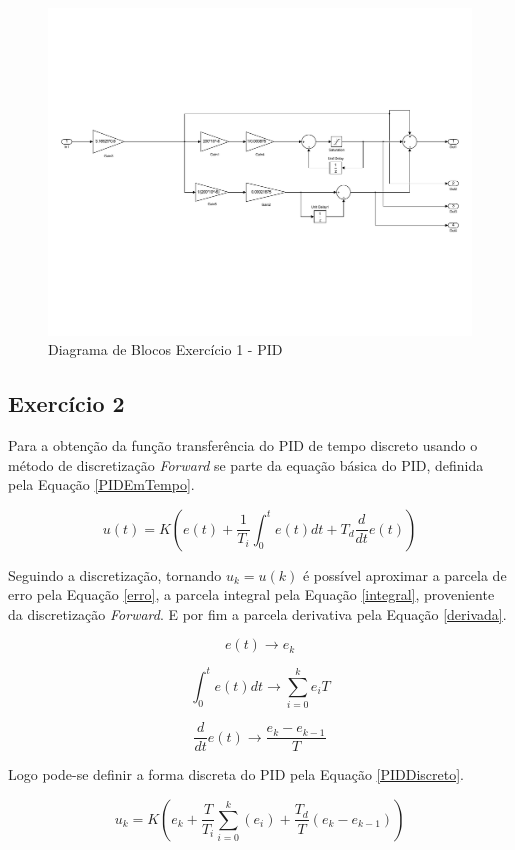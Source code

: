 	\begin{figure}[H]
		\centering
		\includegraphics[scale = .4]{Imagens/Exercicio1_PID_Simulink.pdf}
		\caption{Diagrama de Blocos Exercício 1 - PID}
		\label{fig:Exercicio1_PID_Simulink}
	\end{figure}
	
\subsection{Exercício 2}
	Para a obtenção da função transferência do PID de tempo discreto usando o método de discretização \emph{Forward} se parte da equação básica do PID, definida pela Equação \ref{PIDEmTempo}.
	
	\begin{equation}
		u(t) = K \left( e(t) + \frac{1}{T_{i}} \int_0^t e(t) dt + T_d \frac{d}{dt} e(t) \right) 
		\label{PIDEmTempo}
	\end{equation}
	
	Seguindo a discretização, tornando $u_k = u(k)$ é possível aproximar a parcela de erro pela Equação \ref{erro}, a parcela integral pela Equação \ref{integral}, proveniente da discretização \emph{Forward}. E por fim a parcela derivativa pela Equação \ref{derivada}.
	
	\begin{equation}
		e(t) \rightarrow e_k
		\label{erro}
	\end{equation}
		
	\begin{equation}
		\int_0^t e(t) dt \rightarrow \sum_{i=0}^{k} e_i T
		\label{integral}
	\end{equation}
	
	\begin{equation}
		\frac{d}{dt} e(t) \rightarrow \frac{e_k - e_{k-1}}{T}
		\label{derivada}
	\end{equation}
	
	Logo pode-se definir a forma discreta do PID pela Equação \ref{PIDDiscreto}.
	 
	\begin{equation}
	u_k = K \left( e_k + \frac{T}{T_i} \sum_{i=0}^{k} (e_i) + \frac{T_d}{T}(e_k - e_{k-1})\right)
	\label{PIDDiscreto}
	\end{equation}
	
			